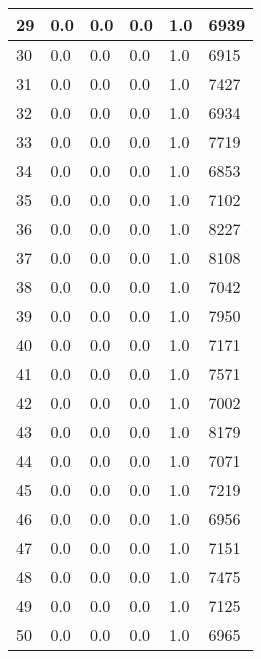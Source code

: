 \begin{longtable}{|l|l|l|l|l|l|}
29 & 0.0 & 0.0 & 0.0 & 1.0 & 6939 \\ \hline 
30 & 0.0 & 0.0 & 0.0 & 1.0 & 6915 \\ \hline 
31 & 0.0 & 0.0 & 0.0 & 1.0 & 7427 \\ \hline 
32 & 0.0 & 0.0 & 0.0 & 1.0 & 6934 \\ \hline 
33 & 0.0 & 0.0 & 0.0 & 1.0 & 7719 \\ \hline 
34 & 0.0 & 0.0 & 0.0 & 1.0 & 6853 \\ \hline 
35 & 0.0 & 0.0 & 0.0 & 1.0 & 7102 \\ \hline 
36 & 0.0 & 0.0 & 0.0 & 1.0 & 8227 \\ \hline 
37 & 0.0 & 0.0 & 0.0 & 1.0 & 8108 \\ \hline 
38 & 0.0 & 0.0 & 0.0 & 1.0 & 7042 \\ \hline 
39 & 0.0 & 0.0 & 0.0 & 1.0 & 7950 \\ \hline 
40 & 0.0 & 0.0 & 0.0 & 1.0 & 7171 \\ \hline 
41 & 0.0 & 0.0 & 0.0 & 1.0 & 7571 \\ \hline 
42 & 0.0 & 0.0 & 0.0 & 1.0 & 7002 \\ \hline 
43 & 0.0 & 0.0 & 0.0 & 1.0 & 8179 \\ \hline 
44 & 0.0 & 0.0 & 0.0 & 1.0 & 7071 \\ \hline 
45 & 0.0 & 0.0 & 0.0 & 1.0 & 7219 \\ \hline 
46 & 0.0 & 0.0 & 0.0 & 1.0 & 6956 \\ \hline 
47 & 0.0 & 0.0 & 0.0 & 1.0 & 7151 \\ \hline 
48 & 0.0 & 0.0 & 0.0 & 1.0 & 7475 \\ \hline 
49 & 0.0 & 0.0 & 0.0 & 1.0 & 7125 \\ \hline 
50 & 0.0 & 0.0 & 0.0 & 1.0 & 6965 \\ \hline 
\end{longtable}